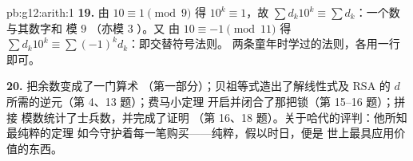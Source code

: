 \begin{solution}{pb:g12:arith:1}
\textbf{19.} 由 $10 \equiv 1 \pmod 9$ 得 $10^k \equiv 1$，故
$\sum d_k 10^k \equiv \sum d_k$：一个数与其数字和
模 $9$ （亦模 $3$ ）。又
由 $10 \equiv -1 \pmod{11}$ 得
$\sum d_k 10^k \equiv \sum (-1)^k d_k$：即交替符号法则。
两条童年时学过的法则，各用一行即可。

\textbf{20.} 把余数变成了一门算术
（第一部分）；贝祖等式造出了解线性式及 RSA
的 $d$ 所需的逆元（第 4、13 题）；费马小定理
开启并闭合了那把锁（第 15--16 题）；拼接
模数统计了士兵数，并完成了证明
（第 16、18 题）。关于哈代的评判：他所知最纯粹的定理
如今守护着每一笔购买——纯粹，假以时日，便是
世上最具应用价值的东西。
\end{solution}
